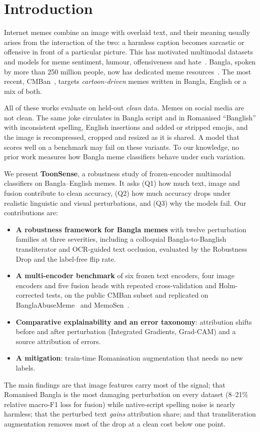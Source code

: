 \section{Introduction}
\label{sec:intro}

Internet memes combine an image with overlaid text, and their meaning usually arises from the interaction of the two:
a harmless caption becomes sarcastic or offensive in front of a particular picture. This has motivated multimodal
datasets and models for meme sentiment, humour, offensiveness and hate~\cite{kiela2020hateful,sharma2020memotion}.
Bangla, spoken by more than 250 million people, now has dedicated meme
resources~\cite{hossain2022memosen,hossain2022mute,das2023banglaabusememe,hossain2024bhm}. The most recent,
CMBan~\cite{cmban2025}, targets \emph{cartoon-driven} memes written in Bangla, English or a mix of both.

All of these works evaluate on held-out \emph{clean} data. Memes on social media are not clean. The same joke
circulates in Bangla script and in Romanised ``Banglish'' with inconsistent spelling, English insertions and added or
stripped emojis, and the image is recompressed, cropped and resized as it is shared. A model that scores well on a
benchmark may fail on these variants. To our knowledge, no prior work measures how Bangla meme classifiers behave
under such variation.

We present \textbf{ToonSense}, a robustness study of frozen-encoder multimodal classifiers on Bangla--English memes.
It asks (Q1) how much text, image and fusion contribute to clean accuracy, (Q2) how much accuracy drops under
realistic linguistic and visual perturbations, and (Q3) why the models fail. Our contributions are:
\begin{itemize}
  \item \textbf{A robustness framework for Bangla memes} with twelve perturbation families at three severities,
  including a colloquial Bangla-to-Banglish transliterator and OCR-guided text occlusion, evaluated by the Robustness
  Drop and the label-free flip rate.
  \item \textbf{A multi-encoder benchmark} of six frozen text encoders, four image encoders and five fusion heads
  with repeated cross-validation and Holm-corrected tests, on the public CMBan subset and replicated on
  BanglaAbuseMeme~\cite{das2023banglaabusememe} and MemoSen~\cite{hossain2022memosen}.
  \item \textbf{Comparative explainability and an error taxonomy}: attribution shifts before and after perturbation
  (Integrated Gradients, Grad-CAM) and a source attribution of errors.
  \item \textbf{A mitigation}: train-time Romanisation augmentation that needs no new labels.
\end{itemize}
The main findings are that image features carry most of the signal; that Romanised Bangla is the most damaging
perturbation on every dataset (8--21\% relative macro-F1 loss for fusion) while native-script spelling noise is
nearly harmless; that the perturbed text \emph{gains} attribution share; and that transliteration augmentation removes
most of the drop at a clean cost below one point.
